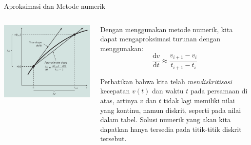 \begin{frame}{Aproksimasi dan Metode numerik}

\begin{columns}[T]
\begin{column}{0.5\textwidth}
{\centering
\includegraphics[width=1\textwidth,height=\textheight]{../chapra_python/Chapra_Fig_1_3.png}
\par}
\end{column}

\begin{column}{0.5\textwidth}
Dengan menggunakan metode numerik, kita dapat mengaproksimasi turunan
dengan menggunakan:
\begin{equation*}
\frac{\mathrm{d}v}{\mathrm{d}t} \approx \frac{v_{i+1} - v_{i}}{t_{i+1} - t_{i}}
\end{equation*}

Perhatikan bahwa kita telah \emph{mendiskritisasi} kecepatan $v(t)$
dan waktu $t$ pada persamaan di atas, artinya $v$ dan $t$ tidak
lagi memiliki nilai yang kontinu, namun diskrit, seperti pada nilai
dalam tabel. Solusi numerik yang akan kita dapatkan hanya tersedia pada
titik-titik diskrit tersebut.
\end{column}
\end{columns}
\end{frame}





